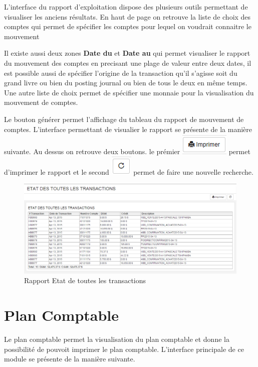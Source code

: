 \documentclass[12pt,a4paper]{report}
\begin{document}
L'interface du rapport d'exploitation dispose des plusieurs outils permettant de visualiser les anciens résultats. En haut de page on retrouve la liste de choix des comptes qui permet de spécifier les comptes pour lequel on voudrait connaitre le mouvement

Il existe aussi deux zones \textbf{Date du} et \textbf{Date au} qui permet visualiser le rapport du mouvement des comptes en precisant une plage de valeur entre deux dates, il est possible aussi de spécifier l'origine de la transaction qu'il s'agisse soit du grand livre ou bien du posting journal ou bien de tous le deux en même temps. Une autre liste de choix permet de spécifier une monnaie pour la visualisation du mouvement de comptes.

Le bouton générer permet l'affichage du tableau du rapport de mouvement de comptes. L'interface permettant de visualier le rapport se présente de la manière suivante. Au dessus on retrouve deux boutons. le prémier 
\includegraphics[scale=0.7]{pic/Print.png} permet d'imprimer le rapport et le second \includegraphics[scale=0.7]{pic/refresh.png} permet de faire une nouvelle recherche.

\begin{figure}[h]
\begin{center}
\includegraphics[width=14cm]{pic/EtatAllTransaction.png}
\end{center}
\caption{Rapport Etat de toutes les transactions}
\label{Rapport Etat de toutes les transactions}
\end{figure}



\newpage
\section{Plan Comptable}
Le plan comptable permet la visualisation du plan comptable et donne la possibilité de pouvoit imprimer le plan comptable. L'interface principale de ce module se présente de la manière suivante. 
\end{document}

